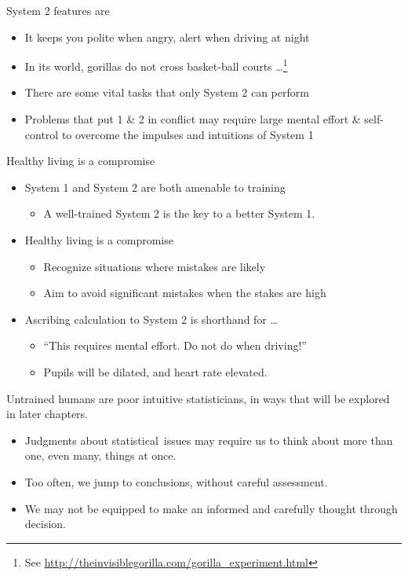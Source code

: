 \documentclass[
  10pt,
  b5paper]{book}
\providecommand{\tightlist}{%
  \setlength{\itemsep}{0pt}\setlength{\parskip}{0pt}}
\begin{document}
System 2 features are

\begin{itemize}
\tightlist
\item
  It keeps you polite when angry, alert when driving at night
\item
  In its world, gorillas do not cross basket-ball courts \ldots{}\footnote{See \url{http://theinvisiblegorilla.com/gorilla_experiment.html}}
\item
  There are some vital tasks that only System 2 can perform
\item
  Problems that put 1 \& 2 in conflict may require large
  mental effort \& self-control to overcome the impulses and
  intuitions of System 1
\end{itemize}

Healthy living is a compromise

\begin{itemize}
\tightlist
\item
  System 1 and System 2 are both amenable to training

  \begin{itemize}
  \tightlist
  \item
    A well-trained System 2 is the key to a better System 1.\\
  \end{itemize}
\item
  Healthy living is a compromise

  \begin{itemize}
  \tightlist
  \item
    Recognize situations where mistakes are likely
  \item
    Aim to avoid significant mistakes when the stakes are high
  \end{itemize}
\item
  Ascribing calculation to System 2 is shorthand for \ldots{}

  \begin{itemize}
  \tightlist
  \item
    ``This requires mental effort. Do not do when driving!''
  \item
    Pupils will be dilated, and heart rate elevated.
  \end{itemize}
\end{itemize}

Untrained humans are poor intuitive statisticians, in ways that
will be explored in later chapters.

\begin{itemize}
\tightlist
\item
  Judgments about statistical~issues may require us to think
  about more than one, even many, things at once.
\item
  Too often, we jump to conclusions, without careful assessment.
\item
  We may not be equipped to make an informed and carefully
  thought through decision.
\end{itemize}
\end{document}
